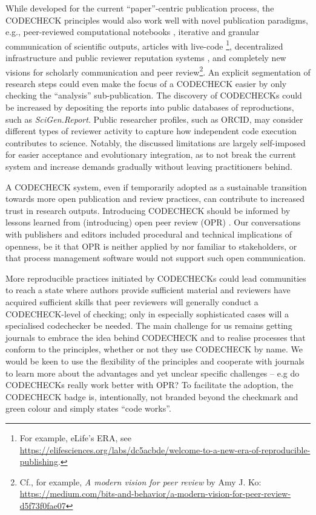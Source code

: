 \documentclass[12pt]{article}
\begin{document}
While developed for the current ``paper''-centric publication process,
the CODECHECK principles would also work well with novel publication
paradigms, e.g., peer-reviewed computational notebooks
\cite{earthcube_new_2020}, iterative and granular communication of
scientific outputs, articles with live-code
\cite{perkel_pioneering_2019-1} \footnote{For example, eLife's ERA,
  see
  \url{https://elifesciences.org/labs/dc5acbde/welcome-to-a-new-era-of-reproducible-publishing}.},
decentralized infrastructure and public reviewer reputation systems
\cite{tenorio-fornes_towards_2019}, and completely new visions for
scholarly communication and peer review\footnote{Cf., for example,
  \emph{A modern vision for peer review} by Amy J. Ko:
  \url{https://medium.com/bits-and-behavior/a-modern-vision-for-peer-review-d5f73f0fae07}}.
An explicit segmentation of research steps could even make the focus
of a CODECHECK easier by only checking the ``analysis''
sub-publication.  The discovery of CODECHECKs could be increased by
depositing the reports into public databases of reproductions, such as
\emph{SciGen.Report}.  Public researcher profiles, such as ORCID, may
consider different types of reviewer activity to capture how
independent code execution contributes to science.  Notably, the
discussed limitations are largely self-imposed for easier acceptance
and evolutionary integration, as to not break the current system and
increase demands gradually without leaving practitioners behind.

A CODECHECK system, even if temporarily adopted as a sustainable
transition towards more open publication and review practices, can
contribute to increased trust in research outputs. Introducing
CODECHECK should be informed by lessons learned from (introducing)
open peer review (OPR) \cite{ross-hellauer_guidelines_2019}.  Our
conversations with publishers and editors included procedural and
technical implications of openness, be it that OPR is neither applied
by nor familiar to stakeholders, or that process management software
would not support such open communication.

More reproducible practices initiated by CODECHECKs could lead
communities to reach a state where authors provide sufficient material
and reviewers have acquired sufficient skills that peer reviewers will
generally conduct a CODECHECK-level of checking; only in especially
sophisticated cases will a specialised codechecker be needed.  The
main challenge for us remains getting journals to embrace the idea
behind CODECHECK and to realise processes that conform to the
principles, whether or not they use CODECHECK by name.  We would be
keen to use the flexibility of the principles and cooperate with
journals to learn more about the advantages and yet unclear specific
challenges -- e.g do CODECHECKs really work better with OPR?  To
facilitate the adoption, the CODECHECK badge is, intentionally, not
branded beyond the checkmark and green colour and simply states ``code
works''.
\end{document}
